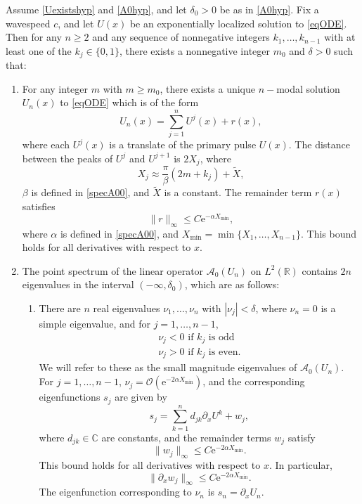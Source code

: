 \documentclass[review,onefignum,onetabnum]{siamart171218}
\newcommand{\C}{\mathbb{C}}
\newcommand{\R}{\mathbb{R}}
\newcommand{\rme}{\mathrm{e}}
\newcommand{\calA}{\mathcal{A}}
\begin{document}
\begin{theorem}\label{multiexist}
Assume \cref{Uexistshyp} and \cref{A0hyp}, and let $\delta_0 > 0$ be as in \cref{A0hyp}. Fix a wavespeed $c$, and let $U(x)$ be an exponentially localized solution to \cref{eqODE}. Then for any $n \geq 2$ and any sequence of nonnegative integers $k_1, \dots, k_{n-1}$ with at least one of the $k_j \in \{0, 1 \}$, there exists a nonnegative integer $m_0$ and $\delta > 0$ such that:
\begin{enumerate}%
	\item For any integer $m$ with $m \geq m_0$, there exists a unique $n-$modal solution $U_n(x)$ to \cref{eqODE} which is of the form
	\begin{equation}\label{qn}
	U_n(x) = \sum_{j = 1}^{n} U^j(x) + r(x),
	\end{equation}
	where each $U^j(x)$ is a translate of the primary pulse $U(x)$. The distance between the peaks of $U^j$ and $U^{j+1}$ is $2 X_j$, where
	\begin{equation*}
	X_j \approx \frac{\pi}{\beta}(2 m + k_j) + \tilde{X},
	\end{equation*}
	$\beta$ is defined in \cref{specA00}, and $\tilde{X}$ is a constant. The remainder term $r(x)$ satisfies
	\begin{equation}\label{rbound}
	\|r\|_\infty \leq C \rme^{-\alpha X_{\mathrm{min}}},
	\end{equation}
	where $\alpha$ is defined in \cref{specA00}, and $X_{\mathrm{min}} = \min\{X_1, \dots, X_{n-1}\}$. This bound holds for all derivatives with respect to $x$.

	\item The point spectrum of the linear operator $\calA_0(U_n)$ on $L^2(\R)$ contains $2n$ eigenvalues in the interval $(-\infty, \delta_0)$, which are as follows:
  \begin{enumerate}
    \item There are $n$ real eigenvalues $\nu_1, \dots, \nu_n$ with $|\nu_j| < \delta$, where $\nu_n = 0$ is a simple eigenvalue, and for $j = 1, \dots, n-1$,
    \[
  	\begin{array}{l}
  	\nu_j < 0 \text{ if } k_j \text{ is odd} \\
  	\nu_j > 0 \text{ if } k_j \text{ is even.}
  	\end{array}
    \]
    We will refer to these as the small magnitude eigenvalues of $\calA_0(U_n)$. For $j = 1, \dots, n-1$, $\nu_j = \mathcal{O}(\rme^{-2\alpha X_{\mathrm{min}}})$, and the corresponding eigenfunctions $s_j$ are given by
  	\begin{equation}\label{sj}
  	s_j = \sum_{k = 1}^{n} d_{jk}\partial_x U^k + w_j,
  	\end{equation}
  	where $d_{jk} \in \C$ are constants, and the remainder terms $w_j$ satisfy
  	\begin{equation}\label{sjwbound}
  	\|w_j\|_\infty \leq C\rme^{-2 \alpha X_{\mathrm{min}}}.
  	\end{equation}
    This bound holds for all derivatives with respect to $x$. In particular,
    \[
    \| \partial_x w_j\|_\infty \leq C\rme^{-2 \alpha X_{\mathrm{min}}}.
    \]
    The eigenfunction corresponding to $\nu_n$ is $s_n = \partial_x U_n$.


\end{enumerate}
\end{enumerate}
\end{theorem}
\end{document}
